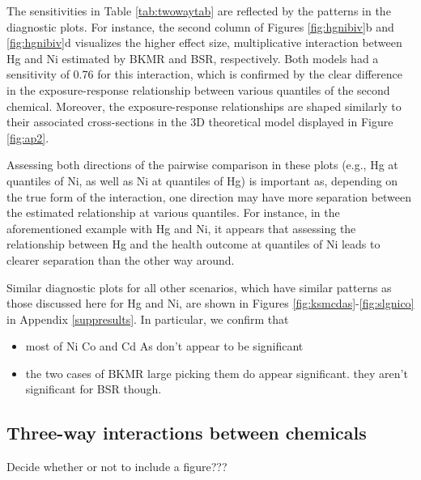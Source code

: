 \documentclass[12pt, twoside]{amherstthesis}
\providecommand{\tightlist}{%
  \setlength{\itemsep}{0pt}\setlength{\parskip}{0pt}}
\begin{document}
The sensitivities in Table \ref{tab:twowaytab} are reflected by the patterns in the diagnostic plots. For instance, the second column of Figures \ref{fig:hgnibiv}b and \ref{fig:hgnibiv}d visualizes the higher effect size, multiplicative interaction between Hg and Ni estimated by BKMR and BSR, respectively. Both models had a sensitivity of 0.76 for this interaction, which is confirmed by the clear difference in the exposure-response relationship between various quantiles of the second chemical. Moreover, the exposure-response relationships are shaped similarly to their associated cross-sections in the 3D theoretical model displayed in Figure \ref{fig:ap2}.

Assessing both directions of the pairwise comparison in these plots (e.g., Hg at quantiles of Ni, as well as Ni at quantiles of Hg) is important as, depending on the true form of the interaction, one direction may have more separation between the estimated relationship at various quantiles. For instance, in the aforementioned example with Hg and Ni, it appears that assessing the relationship between Hg and the health outcome at quantiles of Ni leads to clearer separation than the other way around.

Similar diagnostic plots for all other scenarios, which have similar patterns as those discussed here for Hg and Ni, are shown in Figures \ref{fig:ksmcdas}-\ref{fig:slgnico} in Appendix \ref{suppresults}. In particular, we confirm that
\begin{itemize}
\tightlist
\item
  most of Ni Co and Cd As don't appear to be significant
\item
  the two cases of BKMR large picking them do appear significant. they aren't significant for BSR though.
\end{itemize}
\hypertarget{three-way-interactions-between-chemicals}{%
\subsection{Three-way interactions between chemicals}\label{three-way-interactions-between-chemicals}}

Decide whether or not to include a figure???
\end{document}
